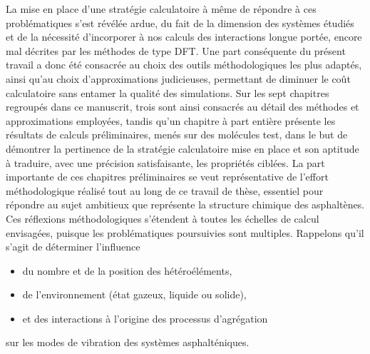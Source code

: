 	La mise en place d'une stratégie calculatoire à même de répondre à ces problématiques s'est révélée ardue, du fait de la dimension des systèmes étudiés et de la nécessité d'incorporer à nos calculs des interactions longue portée, encore mal décrites par les méthodes de type DFT. Une part conséquente du présent travail a donc été consacrée au choix des outils méthodologiques les plus adaptés, ainsi qu'au choix d'approximations judicieuses, permettant de diminuer le coût calculatoire sans entamer la qualité des simulations. 
	Sur les sept chapitres regroupés dans ce manuscrit, trois sont ainsi consacrés au détail des méthodes et approximations employées, tandis qu'un chapitre à part entière présente les résultats de calculs préliminaires, menés sur des molécules test, dans le but de démontrer la pertinence de la stratégie calculatoire mise en place et son aptitude à traduire, avec une précision satisfaisante, les propriétés ciblées. 
	La part importante de ces chapitres préliminaires se veut représentative de l'effort méthodologique réalisé tout au long de ce travail de thèse, essentiel pour répondre au sujet ambitieux que représente la structure chimique des asphaltènes. Ces réflexions méthodologiques s'étendent à toutes les échelles de calcul envisagées, puisque les problématiques poursuivies sont multiples. Rappelons qu'il s'agit de déterminer l'influence 
	\begin{itemize}
	\item du nombre et de la position des hétéroéléments,
	\item de l'environnement (état gazeux, liquide ou solide),
	\item et des interactions à l'origine des processus d'agrégation
	\end{itemize}
sur les modes de vibration des systèmes asphalténiques.
 
